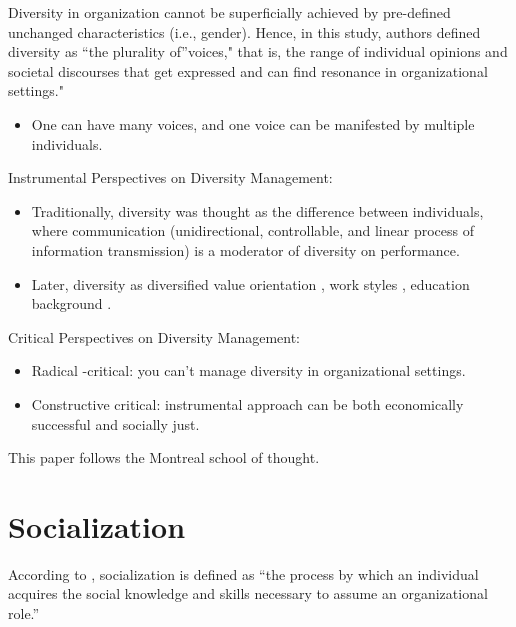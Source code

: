 \documentclass[
]{book}
\providecommand{\tightlist}{%
  \setlength{\itemsep}{0pt}\setlength{\parskip}{0pt}}
\begin{document}
\citep{Trittin_2015}

Diversity in organization cannot be superficially achieved by pre-defined unchanged characteristics (i.e., gender).
Hence, in this study, authors defined diversity as ``the plurality of''voices," that is, the range of individual opinions
and societal discourses that get expressed and can find resonance in organizational settings."

\begin{itemize}
\tightlist
\item
  One can have many voices, and one voice can be manifested by multiple individuals.
\end{itemize}

Instrumental Perspectives on Diversity Management:

\begin{itemize}
\tightlist
\item
  Traditionally, diversity was thought as the difference between individuals, where communication (unidirectional,
  controllable, and linear process of information transmission) is a moderator of diversity on performance.
\item
  Later, diversity as diversified value orientation \citep{Eastman_2003}, work styles \citep{Shelton_2002}, education background
  \citep{Kearney_2009}.
\end{itemize}

Critical Perspectives on Diversity Management:

\begin{itemize}
\tightlist
\item
  Radical -critical: you can't manage diversity in organizational settings.
\item
  Constructive critical: instrumental approach can be both economically successful and socially just.
\end{itemize}

This paper follows the Montreal school of thought.

\hypertarget{socialization}{%
\chapter{Socialization}\label{socialization}}

\citep{Kramer_2011}

According to \citep{Van_Maanen_1979}, socialization is defined as ``the process by which an individual acquires the social
knowledge and skills necessary to assume an organizational role.''
\end{document}
